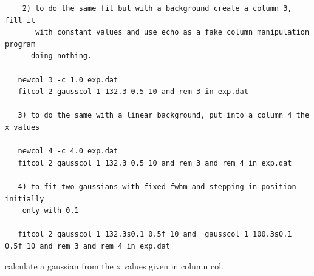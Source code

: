 \begin{description}
\begin{verbatim}
    2) to do the same fit but with a background create a column 3, fill it
       with constant values and use echo as a fake column manipulation program
      doing nothing.

   newcol 3 -c 1.0 exp.dat
   fitcol 2 gausscol 1 132.3 0.5 10 and rem 3 in exp.dat

   3) to do the same with a linear background, put into a column 4 the x values

   newcol 4 -c 4.0 exp.dat
   fitcol 2 gausscol 1 132.3 0.5 10 and rem 3 and rem 4 in exp.dat

   4) to fit two gaussians with fixed fwhm and stepping in position initially
    only with 0.1

   fitcol 2 gausscol 1 132.3s0.1 0.5f 10 and  gausscol 1 100.3s0.1 0.5f 10 and rem 3 and rem 4 in exp.dat
\end{verbatim}
\item[\prg gausscol\index{gausscol}\label{gausscol} col position fwhm area *.*:]  calculate a
gaussian from the x values given in column col.
    

\end{description}
